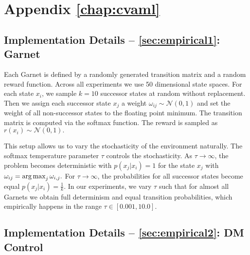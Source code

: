 \chapter{Appendix \autoref{chap:cvaml}}

\section{Implementation Details -- \autoref{sec:empirical1}: Garnet}
\label{app:model_design}

Each Garnet is defined by a randomly generated transition matrix and a random reward function.
Across all experiments we use 50 dimensional state spaces.
For each state $x_i$, we sample $k=10$ successor states at random without replacement.
Then we assign each successor state $x_j$ a weight $\omega_{ij} \sim \mathcal{N}(0, 1)$ and set the weight of all non-successor states to the floating point minimum.
The transition matrix is computed via the softmax function.
The reward is sampled as $r(x_i) \sim \mathcal{N}(0,1).$

This setup allows us to vary the stochasticity of the environment naturally.
The softmax temperature parameter $\tau$ controls the stochasticity.
As $\tau \rightarrow \infty$, the problem becomes deterministic with $p(x_j|x_i) = 1$ for the state $x_j$ with $\omega_{ij} = \operatorname*{arg\,max}_j \omega_{i,j}.$
For $\tau \rightarrow \infty$, the probabilities for all successor states become equal $p(x_j|x_i) = \frac{1}{k}.$
In our experiments, we vary $\tau$ such that for almost all Garnets we obtain full determinism and equal transition probabilities, which empirically happens in the range $\tau \in [0.001, 10.0].$

\section{Implementation Details --  \autoref{sec:empirical2}: DM Control}
\label{app:model_design}

